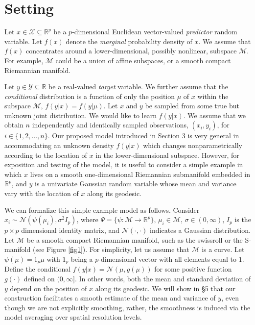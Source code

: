 \documentclass{article}
\newcommand{\Real}{\mathbb{R}}
\providecommand{\mc}[1]{\mathcal{#1}}
\newcommand{\from}{{\ensuremath{\colon}}}           %
\begin{document}
\section{Setting}
Let $x \in \mathcal{X} \subseteq \Real^p$ be a $p$-dimensional Euclidean vector-valued \emph{predictor} random variable.  Let $f(x)$ denote the \emph{marginal} probability density of $x$.  We assume that $f(x)$ concentrates around a lower-dimensional, possibly nonlinear, subspace $\mc{M}$.  For example, $\mc{M}$ could be a union of affine subspaces, or a smooth compact Riemannian manifold.  

Let $y \in  \mathcal{Y} \subseteq \Real$ be a real-valued \emph{target} variable. We further assume that the \emph{conditional} distribution is a function of only the position $\mu$ of $x$ within the subspace $\mathcal{M}$, $f(y|x)=f(y|\mu)$. Let $x$ and $y$ be sampled from some true but unknown joint distribution. We would like to learn $f(y| x)$.  We assume that we obtain $n$ independently and identically sampled observations, $(x_i,y_i) $, for $i \in \{1,2,\ldots,n\}$.  
Our proposed model introduced in Section 3 is very general in accommodating an unknown density $f(y|x)$ which changes nonparametrically according to the location of $x$ in the lower-dimensional subspace.  However, for exposition and testing of the model, it is useful to consider a simple example in which $x$ lives on a smooth one-dimensional Riemannian submanifold embedded in $\Real^p$, and  $y$ is a univariate Gaussian random variable whose mean and variance vary with the location of $x$ along its geodesic.  

We can formalize this simple example model as follows. Consider  $x_i \sim \mc{N}(\psi(\mu_i),\sigma^2 I_p)$, where $\Psi =\{ \psi \from \mc{M} \to \Real^p\}$, $\mu_i \in \mc{M}$, $\sigma \in (0,\infty)$, $I_p$ is the $p\times p$ dimensional identity matrix, and $\mc{N}(\cdot,\cdot)$ indicates a Gaussian distribution.  Let $\mc{M}$ be a smooth compact Riemannian manifold, such as the swissroll or the S-manifold (see Figure \ref{fig1}). For simplicity, let us assume that $\mc{M}$ is a curve. Let $\psi(\mu)=1_p \mu$ with $1_p$ being a $p$-dimensional vector with all elements equal to $1$. Define the conditional $f(y|x) = \mc{N}( \mu, g(\mu))$ for some positive function $g(\cdot)$ defined on $(0,\infty]$. In other words, both the mean and standard deviation of $y$ depend on the position of $x$ along its geodesic. We will show in \S 5 that  our construction facilitates a smooth estimate of the mean and variance of $y$, even though we are not explicitly smoothing, rather, the smoothness is induced via the  model averaging over spatial resolution levels.
\end{document}
